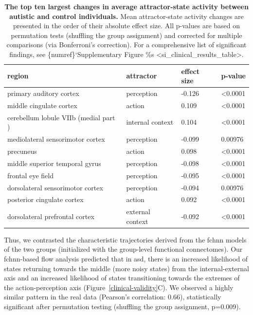 \documentclass{article}
\begin{document}
\begin{table}
\centering
\caption[]{\textbf{The top ten largest changes in average attractor-state activity between autistic and control individuals.}  Mean attractor-state activity changes are presented in the order of their absolute effect size. All p-values are based on permutation tests (shuffling the group assignment) and corrected for multiple comparisons (via Bonferroni's correction). For a comprehensive list of significant findings, see \{numref\}`Supplementary Figure \%s \textless si\_clinical\_results\_table\textgreater .}
\label{tab-clinical-results}
\begin{tabular}{p{}p{}p{}p{}}
\toprule
region & attractor & effect size & p-value \\
\hline
primary auditory cortex & perception & -0.126 & \textless 0.0001 \\
mid\acrshort{dl}e cingulate cortex & action & 0.109 & \textless 0.0001 \\
cerebellum lobule VIIb (medial part  ) & internal context & 0.104 & \textless 0.0001 \\
mediolateral sensorimotor cortex & perception & -0.099 & 0.00976 \\
precuneus & action & 0.098 & \textless 0.0001 \\
mid\acrshort{dl}e superior temporal gyrus & perception & -0.098 & \textless 0.0001 \\
frontal eye field & perception & -0.095 & \textless 0.0001 \\
dorsolateral sensorimotor cortex & perception & -0.094 & 0.00976 \\
posterior cingulate cortex & action & 0.092 & \textless 0.0001 \\
dorsolateral prefrontal cortex & external context & -0.092 & \textless 0.0001 \\
\bottomrule
\end{tabular}
\end{table}

Thus, we contrasted the characteristic trajectories derived from the \acrshort{fchnn} models of the two groups (initialized with the group-level functional connectomes). Our \acrshort{fchnn}-based flow analysis predicted that in \acrshort{asd}, there is an increased likelihood of states returning towards the mid\acrshort{dl}e (more noisy states) from the internal-external axis and an increased likelihood of states transitioning towards the extremes of the action-perception axis (Figure~\ref{clinical-validity}C). We observed a highly similar pattern in the real data (Pearson's correlation: 0.66), statistically significant after permutation testing (shuffling the group assignment, p=0.009).
\end{document}
